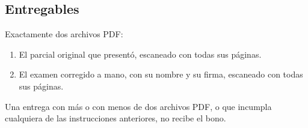 \subsection{Entregables}

Exactamente dos archivos PDF:

\begin{enumerate}
  \item El parcial original que presentó, escaneado con todas sus páginas.
  \item El examen corregido a mano, con su nombre y su firma, escaneado con todas sus páginas.
\end{enumerate}

Una entrega con más o con menos de dos archivos PDF, o que incumpla cualquiera de las instrucciones anteriores, no recibe el bono.
